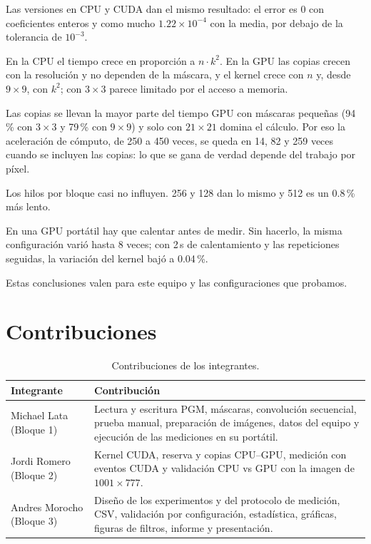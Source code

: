 \documentclass[12pt]{article}
\begin{document}
Las versiones en CPU y CUDA dan el mismo resultado: el error es 0 con coeficientes enteros y
como mucho $1.22\times10^{-4}$ con la media, por debajo de la tolerancia de $10^{-3}$.

En la CPU el tiempo crece en proporción a $n\cdot k^2$. En la GPU las copias crecen con la
resolución y no dependen de la máscara, y el kernel crece con $n$ y, desde $9\times9$, con
$k^2$; con $3\times3$ parece limitado por el acceso a memoria.

Las copias se llevan la mayor parte del tiempo GPU con máscaras pequeñas (94\,\% con
$3\times3$ y 79\,\% con $9\times9$) y solo con $21\times21$ domina el cálculo. Por eso la
aceleración de cómputo, de 250 a 450 veces, se queda en 14, 82 y 259 veces cuando se incluyen
las copias: lo que se gana de verdad depende del trabajo por píxel.

Los hilos por bloque casi no influyen. 256 y 128 dan lo mismo y 512 es un 0.8\,\% más lento.

En una GPU portátil hay que calentar antes de medir. Sin hacerlo, la misma configuración varió
hasta 8 veces; con 2\,s de calentamiento y las repeticiones seguidas, la variación del kernel
bajó a 0.04\,\%.

Estas conclusiones valen para este equipo y las configuraciones que probamos.

\section{Contribuciones}

\begin{table}[H]
\centering
\caption{Contribuciones de los integrantes.}
\begin{tabular}{lp{11cm}}
\toprule
Integrante & Contribución \\
\midrule
Michael Lata (Bloque 1) & Lectura y escritura PGM, máscaras, convolución secuencial, prueba
  manual, preparación de imágenes, datos del equipo y ejecución de las mediciones en su
  portátil. \\
Jordi Romero (Bloque 2) & Kernel CUDA, reserva y copias CPU--GPU, medición con eventos CUDA y
  validación CPU vs GPU con la imagen de $1001\times777$. \\
Andres Morocho (Bloque 3) & Diseño de los experimentos y del protocolo de medición, CSV,
  validación por configuración, estadística, gráficas, figuras de filtros, informe y
  presentación. \\
\bottomrule
\end{tabular}
\end{table}
\end{document}
